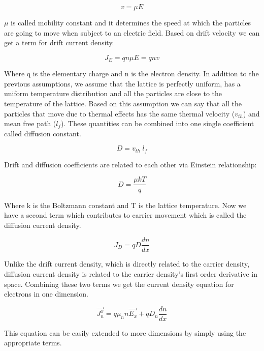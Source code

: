 \begin{equation}
v=\mu E
\end{equation}

$\mu$ is called mobility constant and it determines the speed at which the particles are going to move when subject to an electric field. Based on drift velocity we can get a term for drift current density.

\begin{equation}
J_E=q n\mu E=q n v 
\end{equation}

Where q is the elementary charge and n is the electron density. In addition to the previous assumptions, we assume that the lattice is perfectly uniform, has a uniform temperature distribution and all the particles are close to the temperature of the lattice. Based on this assumption we can say that all the particles that move due to thermal effects has the same thermal velocity ($v_{th}$) and mean free path ($l_f$). These quantities can be combined into one single coefficient called diffusion constant. 

\begin{equation}
D=v_{th} \;l_f
\end{equation}

Drift and diffusion coefficients are related to each other via Einstein relationship:

\begin{equation}
D=\frac{\mu k T}{q}
\end{equation}

Where k is the Boltzmann constant and T is the lattice temperature. Now we have a second term which contributes to carrier movement which is called the diffusion current density.

\begin{equation}
J_D=qD\frac{dn}{dx}
\end{equation}

Unlike the drift current density, which is directly related to the carrier density, diffusion current density is related to the carrier density's first order derivative in space. Combining these two terms we get the current density equation for electrons in one dimension.

\begin{equation}
\vec{J_n^x}=q \mu_{n} n \vec{E_x}+qD_{n} \frac{dn}{dx} 
\label{cdenn}
\end{equation}

This equation can be easily extended to more dimensions by simply using the appropriate terms.

